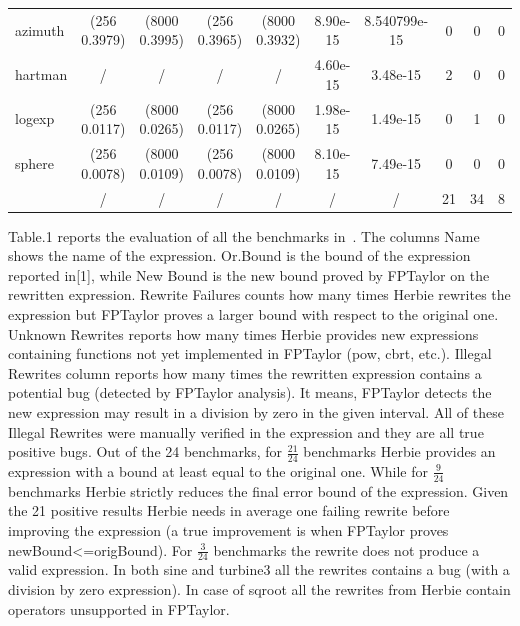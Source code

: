 \documentclass[runningheads]{llncs}
\begin{document}
\begin{table}[h]
\begin{adjustbox}{center}
\begin{tabular}{l|c|c|c|c|c|c|c|c|c|}
		azimuth &(256 0.3979) &(8000 0.3995)&(256 0.3965) &(8000 0.3932)& 8.90e-15 & 8.540799e-15 & 0& 0& 0\\
		hartman &/&/&/&/& 4.60e-15 & 3.48e-15& 2& 0& 0\\
		logexp &(256 0.0117) &(8000 0.0265)&(256 0.0117) &(8000 0.0265)& 1.98e-15& 1.49e-15& 0& 1& 0\\
		sphere &(256 0.0078) &(8000 0.0109)&(256 0.0078) &(8000 0.0109)& 8.10e-15& 7.49e-15& 0& 0& 0\\
		\hline
		&/&/&/&/ & / & / & 21 & 34 &8\\		
		\hline
	\end{tabular}
\end{adjustbox}
\end{table}



Table.1 reports the evaluation of all the benchmarks in~\cite{fptaylor}. The columns Name shows the name of the expression. Or.Bound is the bound of the expression reported in[1], while New Bound is the new bound proved by FPTaylor on the rewritten expression. Rewrite Failures counts how many times Herbie rewrites the expression but FPTaylor proves a larger bound with respect to the original one.
Unknown Rewrites reports how many times Herbie provides new expressions containing functions not yet implemented in FPTaylor (pow, cbrt, etc.). Illegal Rewrites column reports how many times the rewritten expression contains a potential bug (detected by FPTaylor analysis). It means, FPTaylor detects the new expression may result in a division by zero in the given interval. All of these Illegal Rewrites were manually verified in the expression and they are all true positive bugs.
Out of the 24 benchmarks, for $\frac{21}{24}$ benchmarks Herbie provides an expression with a bound at least equal to the original one. While for $\frac{9}{24}$ benchmarks Herbie strictly reduces the final error bound of the expression. 
Given the 21 positive results Herbie needs in average one failing rewrite before improving the expression (a true improvement is when FPTaylor proves newBound<=origBound).
For $\frac{3}{24}$ benchmarks the rewrite does not produce a valid expression. In both sine and turbine3 all the rewrites contains a bug (with a division by zero expression). 
In case of sqroot all the rewrites from Herbie contain operators unsupported in FPTaylor.
\end{document}
